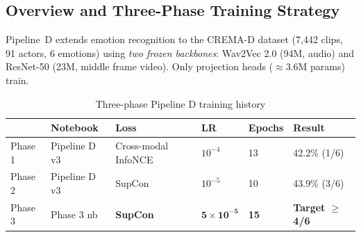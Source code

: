 \documentclass[12pt,a4paper]{article}
\theoremstyle{definition}
\theoremstyle{plain}
\theoremstyle{remark}
\begin{document}
\subsection{Overview and Three-Phase Training Strategy}

Pipeline~D extends emotion recognition to the CREMA-D dataset (7,442 clips, 91 actors, 6 emotions) using \emph{two frozen backbones}: Wav2Vec 2.0 (94M, audio) and ResNet-50 (23M, middle frame video). Only projection heads ($\approx$3.6M params) train.

\begin{table}[H]
\centering
\caption{Three-phase Pipeline D training history}
\begin{tabularx}{\textwidth}{lXXXXX}
\toprule
& \textbf{Notebook} & \textbf{Loss} & \textbf{LR} & \textbf{Epochs} & \textbf{Result} \\
\midrule
Phase 1 & Pipeline D v3 & Cross-modal InfoNCE & $10^{-4}$ & 13 & 42.2\% (1/6) \\
Phase 2 & Pipeline D v3 & SupCon & $10^{-5}$ & 10 & 43.9\% (3/6) \\
Phase 3 & Phase 3 nb & \textbf{SupCon} & $\mathbf{5\times10^{-5}}$ & \textbf{15} & \textbf{Target $\geq$ 4/6} \\
\bottomrule
\end{tabularx}
\end{table}
\end{document}
